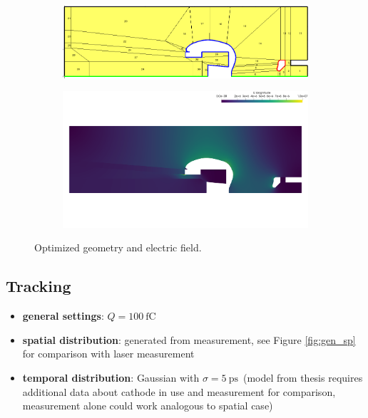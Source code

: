 \begin{center}
\begin{figure}[H]
   \begin{subfigure}{0.45\textwidth}
      \includegraphics[width=\textwidth]{fig/geometry_v6_opt_order=3_run2}
   \end{subfigure}
   \begin{subfigure}{0.45\textwidth}
      \includegraphics[width=\textwidth]{fig/E_v6_opt_order=3_run2}
   \end{subfigure}
   \caption{Optimized geometry and electric field.}
   \label{fig:opt}
\end{figure}
\end{center}

\newpage

\subsection{Tracking}
\begin{itemize}
   \item \textbf{general settings}: $Q=100\ \mathrm{fC}$
   \item \textbf{spatial distribution}: generated from measurement, see Figure \ref{fig:gen_sp} for comparison with laser measurement
   \item \textbf{temporal distribution}: Gaussian with $\sigma=5\ \mathrm{ps}$\ (model from thesis \cite{wagner} requires additional data about cathode in use and measurement for comparison, measurement alone could work analogous to spatial case)
\end{itemize}

